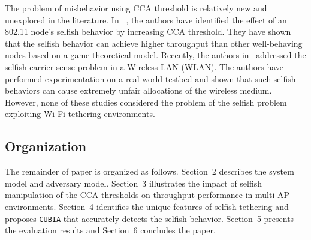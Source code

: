 The problem of misbehavior using CCA threshold is relatively new 
and unexplored in the literature. In~ \cite{yang:choi-LCN09}, the
authors have identified the effect of an 802.11 node's selfish
behavior by increasing CCA threshold.
%
They have shown that the selfish behavior can achieve higher
throughput than other well-behaving nodes based on a game-theoretical
model.
%
Recently, the authors in~\cite{Pelechris:Krish-Infocom09} addressed
the selfish carrier sense problem in a Wireless LAN (WLAN).
The authors have performed experimentation on a real-world testbed 
and shown that such selfish behaviors can cause extremely unfair
allocations of the wireless medium.
%
However, none of these studies considered the problem of the selfish
problem exploiting Wi-Fi tethering environments.


\subsection{Organization}
%
The remainder of paper is organized as follows.
%
Section~2 describes the system model and adversary model.
%
Section~3 illustrates the impact of selfish manipulation of the
CCA thresholds on throughput performance in multi-AP environments.
%
Section~4 identifies the unique features of selfish tethering and
proposes {\tt CUBIA} that accurately detects the selfish behavior.
%
Section~5 presents the evaluation results and Section~6 concludes 
the paper.

